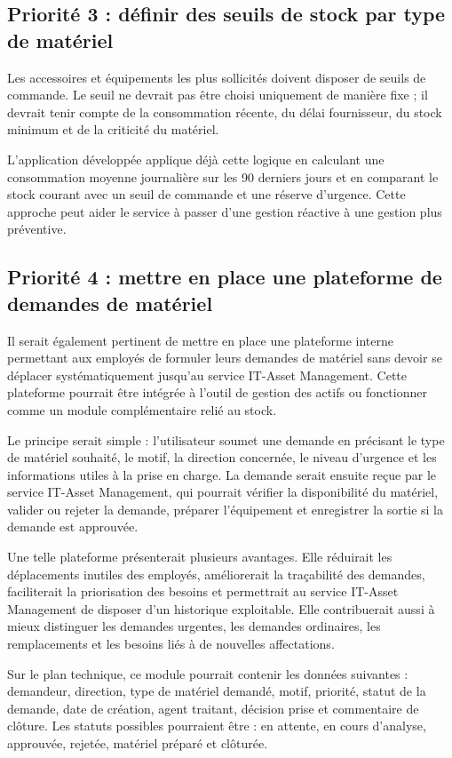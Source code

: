 \documentclass[12pt,a4paper]{report}
\begin{document}
\subsection{Priorité 3 : définir des seuils de stock par type de matériel}

Les accessoires et équipements les plus sollicités doivent disposer de seuils de commande. Le seuil ne devrait pas être choisi uniquement de manière fixe ; il devrait tenir compte de la consommation récente, du délai fournisseur, du stock minimum et de la criticité du matériel.

L'application développée applique déjà cette logique en calculant une consommation moyenne journalière sur les 90 derniers jours et en comparant le stock courant avec un seuil de commande et une réserve d'urgence. Cette approche peut aider le service à passer d'une gestion réactive à une gestion plus préventive.

\subsection{Priorité 4 : mettre en place une plateforme de demandes de matériel}

Il serait également pertinent de mettre en place une plateforme interne permettant aux employés de formuler leurs demandes de matériel sans devoir se déplacer systématiquement jusqu'au service IT-Asset Management. Cette plateforme pourrait être intégrée à l'outil de gestion des actifs ou fonctionner comme un module complémentaire relié au stock.

Le principe serait simple : l'utilisateur soumet une demande en précisant le type de matériel souhaité, le motif, la direction concernée, le niveau d'urgence et les informations utiles à la prise en charge. La demande serait ensuite reçue par le service IT-Asset Management, qui pourrait vérifier la disponibilité du matériel, valider ou rejeter la demande, préparer l'équipement et enregistrer la sortie si la demande est approuvée.

Une telle plateforme présenterait plusieurs avantages. Elle réduirait les déplacements inutiles des employés, améliorerait la traçabilité des demandes, faciliterait la priorisation des besoins et permettrait au service IT-Asset Management de disposer d'un historique exploitable. Elle contribuerait aussi à mieux distinguer les demandes urgentes, les demandes ordinaires, les remplacements et les besoins liés à de nouvelles affectations.

Sur le plan technique, ce module pourrait contenir les données suivantes : demandeur, direction, type de matériel demandé, motif, priorité, statut de la demande, date de création, agent traitant, décision prise et commentaire de clôture. Les statuts possibles pourraient être : en attente, en cours d'analyse, approuvée, rejetée, matériel préparé et clôturée.
\end{document}
